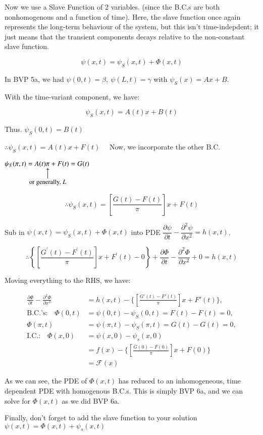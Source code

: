 \documentclass{report}
\makeatletter
\newcommand\parrow[3][3ex]{%
 \begin{array}[t]{@{}c@{}} #2 \\
  \left\uparrow\vcenter{\hrule height #1}\right.\kern-\nulldelimiterspace\\
  \makebox[0pt]{\small#3}
  \end{array}%
}
\makeatother
\begin{document}
Now we use a Slave Function of 2 variables. (since the B.C.s are both nonhomogenous and a function of time). Here, the slave function once again represents the long-term behaviour of the system, but this isn't time-indepdent; it just means that the transient components decays relative to the non-constant slave function.

$$\psi(x, t)=\psi_{S}(x, t)+\Phi(x, t)$$

In BVP 5a, we had $\psi(0, t)=\beta,\ \psi(L, t)=\gamma$ with $\psi_{S}(x)=A x+B$.

With the time-variant component, we have:

$$
\psi_{S}(x, t)=A(t) x+B(t)
$$

Thus. $\psi_{S}(0, t)=B(t)$

$\therefore \psi_{S}(x,t)=A(t) x+F(t) \quad$ Now, we incorporate the other B.C.

$\psi_{S}(\pi, t)=A(t) \parrow{\pi}{or generally, $L$}+F(t)=G(t)$

$$
\therefore \boxed{\psi_{S}(x, t)=\left[\dfrac{G(t)-F(t)}{\pi}\right] x+F(t)}
$$

Sub in $\psi(x, t)=\psi_{S}(x, t)+\Phi(x, t)$ into PDE $\dfrac{\partial \psi}{\partial t}-\dfrac{\partial^{2} \psi}{\partial x^{2}}=h(x, t)$.

$$
\therefore\left\{\left[\dfrac{G^{\prime}(t)-F^{\prime}(t)}{\pi}\right] x+F^{\prime}(t)-0\right\}+\dfrac{\partial \Phi}{\partial t}-\dfrac{\partial^{2} \Phi}{\partial x^{2}}+0=h(x, t)
$$

Moving everything to the RHS, we have:

\[
\begin{aligned}
\frac{\partial \Phi}{\partial t} - \frac{\partial^2 \Phi}{\partial x^2} 
&= h(x,t) - \Biggl\{ \left[\frac{G'(t)-F'(t)}{\pi}\right] x + F'(t) \Biggr\}, \\[1ex]
\text{B.C.'s:}\quad \Phi(0,t) 
&= \psi(0,t) - \psi_S(0,t) = F(t) - F(t) = 0, \\[1ex]
\Phi(\pi,t) 
&= \psi(\pi,t) - \psi_S(\pi,t) = G(t) - G(t) = 0, \\[1ex]
\text{I.C.:}\quad \Phi(x,0) 
&= \psi(x,0) - \psi_s(x,0) \\
&= f(x) - \Biggl\{ \left[\frac{G(0)-F(0)}{\pi}\right] x + F(0) \Biggr\} \\
&= \mathcal{F}(x)
\end{aligned}
\]

\begin{flushleft}
As we can see, the PDE of $\Phi(x,t)$ has reduced to an inhomogeneous, time dependent PDE with homogenous B.C.s. This is simply BVP 6a, and we can solve for $\Phi(x,t)$ as we did BVP 6a.

Finally, don't forget to add the slave function to your solution $\psi(x,t)=\Phi(x,t)+\psi_s(x,t)$
\end{flushleft}
\end{document}
